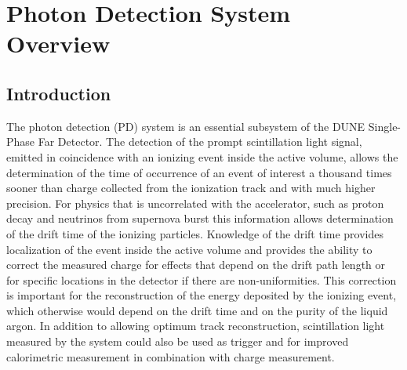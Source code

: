 \section{Photon Detection System Overview}
\label{sec:fdsp-pd-ov}

\subsection{Introduction}
\label{sec:fdsp-pd-intro}

The photon detection (PD) system is an essential subsystem of the DUNE Single-Phase Far Detector. The detection of the prompt scintillation light signal, emitted in coincidence with an ionizing event inside the active volume, allows the determination of the time of occurrence of an event of interest a thousand times sooner than charge collected from the ionization track and with much higher precision. For physics that is uncorrelated with the accelerator, such as proton decay and neutrinos from supernova burst  this information allows determination of the drift time of the ionizing particles.
Knowledge of the drift time provides localization of the event inside the active volume and provides the ability to correct the measured charge for  effects that depend on the drift path length or for specific locations in the detector if there are non-uniformities.  This correction is important for the reconstruction of the energy deposited by the ionizing event, which otherwise would depend on the drift time and on the purity of the liquid argon. In addition to allowing optimum track reconstruction, scintillation light measured by the system could also be used as trigger and for improved calorimetric measurement in combination with charge measurement.

